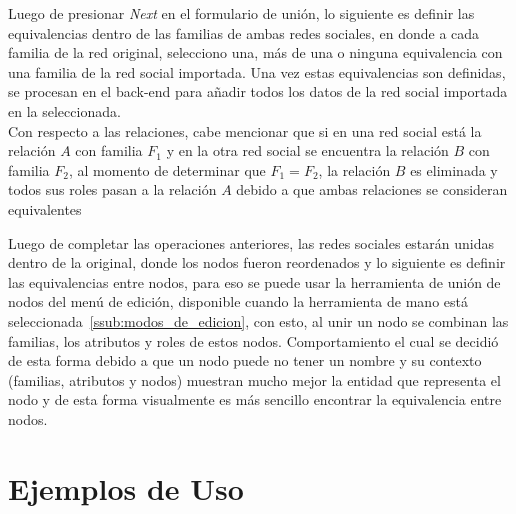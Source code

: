 
Luego de presionar \emph{Next} en el formulario de unión, lo siguiente es definir las equivalencias dentro de las familias de ambas redes sociales, en donde a cada familia de la red original, selecciono una, más de una o ninguna equivalencia con una familia de la red social importada. Una vez estas equivalencias son definidas, se procesan en el back-end para añadir todos los datos de la red social importada en la seleccionada.\\


Con respecto a las relaciones, cabe mencionar que si en una red social está la relación $A$ con familia $F_1$ y en la otra red social se encuentra la relación $B$ con familia $F_2$, al momento de determinar que $F_1 = F_2$, la relación $B$ es eliminada y todos sus roles pasan a la relación $A$ debido a que ambas relaciones se consideran equivalentes

Luego de completar las operaciones anteriores, las redes sociales estarán unidas dentro de la original, donde los nodos fueron reordenados y lo siguiente es definir las equivalencias entre nodos, para eso se puede usar la herramienta de unión de nodos del menú de edición, disponible cuando la herramienta de mano está seleccionada~\ref{ssub:modos_de_edicion}, con esto, al unir un nodo se combinan las familias, los atributos y roles de estos nodos. Comportamiento el cual se decidió de esta forma debido a que un nodo puede no tener un nombre y su contexto (familias, atributos y nodos) muestran mucho mejor la entidad que representa el nodo y de esta forma visualmente es más sencillo encontrar la equivalencia entre nodos.



\section{Ejemplos de Uso} %
\label{sec:ejemplos_de_uso}


